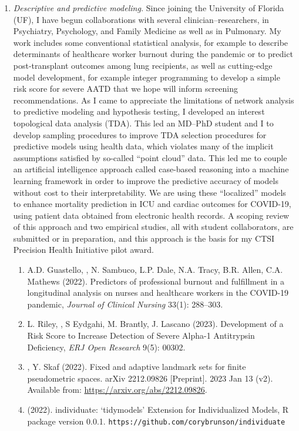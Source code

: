 \documentclass{nihbiosketch}
\begin{document}
\begin{enumerate}
\item \emph{Descriptive and predictive modeling.}
Since joining the University of Florida (UF), I have begun collaborations with several clinician--researchers, in Psychiatry, Psychology, and Family Medicine as well as in Pulmonary.
My work includes some conventional statistical analysis, for example to describe determinants of healthcare worker burnout during the pandemic or to predict post-transplant outcomes among lung recipients, as well as cutting-edge model development, for example integer programming to develop a simple risk score for severe AATD that we hope will inform screening recommendations.
As I came to appreciate the limitations of network analysis to predictive modeling and hypothesis testing, I developed an interest topological data analysis (TDA). This led an MD--PhD student and I to develop sampling procedures to improve TDA selection procedures for predictive models using health data, which violates many of the implicit assumptions satisfied by so-called ``point cloud'' data.
This led me to couple an artificial intelligence approach called case-based reasoning into a machine learning framework in order to improve the predictive accuracy of models without cost to their interpretability. We are using these ``localized'' models to enhance mortality prediction in ICU and cardiac outcomes for COVID-19, using patient data obtained from electronic health records. A scoping review of this approach and two empirical studies, all with student collaborators, are submitted or in preparation, and this approach is the basis for my CTSI Precision Health Initiative pilot award.

\begin{enumerate}
\item A.D. Guastello, , N. Sambuco, L.P. Dale, N.A. Tracy, B.R. Allen, C.A. Mathews (2022). Predictors of professional burnout and fulfillment in a longitudinal analysis on nurses and healthcare workers in the COVID-19 pandemic, \emph{Journal of Clinical Nursing} 33(1): 288--303.
\item L. Riley, , S Eydgahi, M. Brantly, J. Lascano (2023). Development of a Risk Score to Increase Detection of Severe Alpha-1 Antitrypsin Deficiency, \emph{ERJ Open Research} 9(5): 00302.
\item {}, Y. Skaf (2022). Fixed and adaptive landmark sets for finite pseudometric spaces. arXiv 2212.09826 [Preprint]. 2023 Jan 13 (v2).  Available from: \url{https://arxiv.org/abs/2212.09826}.
\item {} (2022). individuate: `tidymodels' Extension for Individualized Models, R package version 0.0.1. \nolinkurl{https://github.com/corybrunson/individuate}
\end{enumerate}


\end{enumerate}
\end{document}
